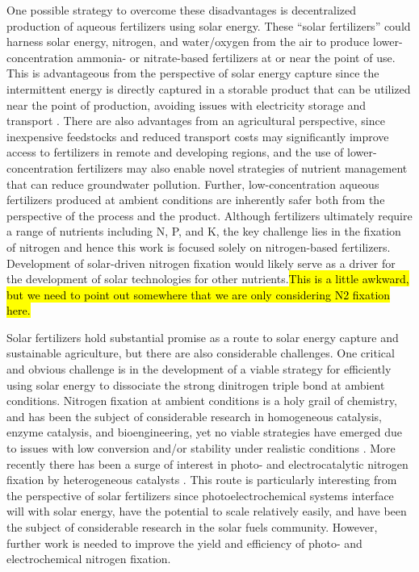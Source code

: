 One possible strategy to overcome these disadvantages is decentralized production of aqueous fertilizers using solar energy. These ``solar fertilizers'' could harness solar energy, nitrogen, and water/oxygen from the air to produce lower-concentration ammonia- or nitrate-based fertilizers at or near the point of use. This is advantageous from the perspective of solar energy capture since the intermittent energy is directly captured in a storable product that can be utilized near the point of production, avoiding issues with electricity storage and transport \cite{MacKay_2013}. There are also advantages from an agricultural perspective, since inexpensive feedstocks and reduced transport costs may significantly improve access to fertilizers in remote and developing regions, and the use of lower-concentration fertilizers may also enable novel strategies of nutrient management that can reduce groundwater pollution. Further, low-concentration aqueous fertilizers produced at ambient conditions are inherently safer both from the perspective of the process and the product. Although fertilizers ultimately require a range of nutrients including N, P, and K, the key challenge lies in the fixation of nitrogen and hence this work is focused solely on nitrogen-based fertilizers. Development of solar-driven nitrogen fixation would likely serve as a driver for the development of solar technologies for other nutrients.\hl{This is a little awkward, but we need to point out somewhere that we are only considering N2 fixation here.}

Solar fertilizers hold substantial promise as a route to solar energy capture and sustainable agriculture, but there are also considerable challenges. One critical and obvious challenge is in the development of a viable strategy for efficiently using solar energy to dissociate the strong dinitrogen triple bond at ambient conditions. Nitrogen fixation at ambient conditions is a holy grail of chemistry, and has been the subject of considerable research in homogeneous catalysis, enzyme catalysis, and bioengineering, yet no viable strategies have emerged due to issues with low conversion and/or stability under realistic conditions \cite{Vicente_2017,Bur_n_2017,MacLeod_2013,Foster2018}. %
More recently there has been a surge of interest in photo- and electrocatalytic nitrogen fixation by heterogeneous catalysts \cite{Medford_2017,Kyriakou_2017}\needcite. This route is particularly interesting from the perspective of solar fertilizers since photoelectrochemical systems interface will with solar energy, have the potential to scale relatively easily, and have been the subject of considerable research in the solar fuels community.\cite{Kondratenko2013} However, further work is needed to improve the yield and efficiency of photo- and electrochemical nitrogen fixation. %

